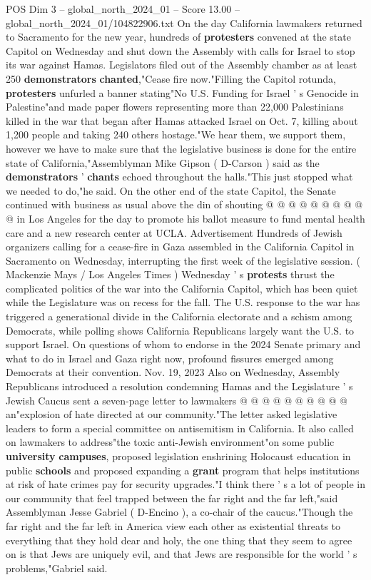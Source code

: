 \begin{textsample}{POS Dim 3 – global\_north\_2024\_01 – Score 13.00 – global\_north\_2024\_01/104822906.txt}  \label{ex:f3_pos_224}
On the day California lawmakers returned to Sacramento for the new year, hundreds of \textbf{protesters} convened at the state Capitol on Wednesday and shut down the Assembly with calls for Israel to stop its war against Hamas.
Legislators filed out of the Assembly chamber as at least 250 \textbf{demonstrators} \textbf{chanted},"Cease fire now."Filling the Capitol rotunda, \textbf{protesters} unfurled a banner stating"No U.S.
Funding for Israel ' s Genocide in Palestine"and made paper flowers representing more than 22,000 Palestinians killed in the war that began after Hamas attacked Israel on Oct. 7, killing about 1,200 people and taking 240 others hostage."We hear them, we support them, however we have to make sure that the legislative business is done for the entire state of California,"Assemblyman Mike Gipson ( D-Carson ) said as the \textbf{demonstrators} ' \textbf{chants} echoed throughout the halls."This just stopped what we needed to do,"he said.
On the other end of the state Capitol, the Senate continued with business as usual above the din of shouting @ @ @ @ @ @ @ @ @ @ in Los Angeles for the day to promote his ballot measure to fund mental health care and a new research center at UCLA.
Advertisement Hundreds of Jewish organizers calling for a cease-fire in Gaza assembled in the California Capitol in Sacramento on Wednesday, interrupting the first week of the legislative session. ( Mackenzie Mays / Los Angeles Times ) Wednesday ' s \textbf{protests} thrust the complicated politics of the war into the California Capitol, which has been quiet while the Legislature was on recess for the fall.
The U.S. response to the war has triggered a generational divide in the California electorate and a schism among Democrats, while polling shows California Republicans largely want the U.S. to support Israel.
On questions of whom to endorse in the 2024 Senate primary and what to do in Israel and Gaza right now, profound fissures emerged among Democrats at their convention.
Nov. 19, 2023 Also on Wednesday, Assembly Republicans introduced a resolution condemning Hamas and the Legislature ' s Jewish Caucus sent a seven-page letter to lawmakers @ @ @ @ @ @ @ @ @ @ an"explosion of hate directed at our community."The letter asked legislative leaders to form a special committee on antisemitism in California.
It also called on lawmakers to address"the toxic anti-Jewish environment"on some public \textbf{university} \textbf{campuses}, proposed legislation enshrining Holocaust education in public \textbf{schools} and proposed expanding a \textbf{grant} program that helps institutions at risk of hate crimes pay for security upgrades."I think there ' s a lot of people in our community that feel trapped between the far right and the far left,"said Assemblyman Jesse Gabriel ( D-Encino ), a co-chair of the caucus."Though the far right and the far left in America view each other as existential threats to everything that they hold dear and holy, the one thing that they seem to agree on is that Jews are uniquely evil, and that Jews are responsible for the world ' s problems,"Gabriel said.

\end{textsample}
